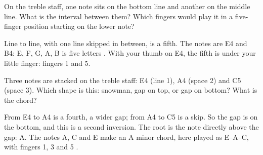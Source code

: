 \begin{exercise}
On the treble staff, one note sits on the bottom line and another on the middle line. What is the interval between them? Which fingers would play it in a five-finger position starting on the lower note?
\end{exercise}

\begin{answerbox}
Line to line, with one line skipped in between, is a fifth. The notes are E4 and B4: E, F, G, A, B is five letters . With your thumb on E4, the fifth is under your little finger: fingers 1 and 5.
\end{answerbox}

\begin{exercise}
Three notes are stacked on the treble staff: E4 (line 1), A4 (space 2) and C5 (space 3). Which shape is this: snowman, gap on top, or gap on bottom? What is the chord?
\end{exercise}

\begin{answerbox}
From E4 to A4 is a fourth, a wider gap; from A4 to C5 is a skip. So the gap is on the bottom, and this is a second inversion. The root is the note directly above the gap: A. The notes A, C and E make an A minor chord, here played as E--A--C, with fingers 1, 3 and 5 .
\end{answerbox}
